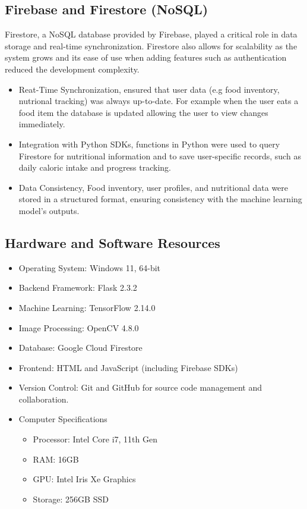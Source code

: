 \documentclass[conference]{IEEEtran}
\begin{document}
\subsection{Firebase and Firestore (NoSQL)}
Firestore, a NoSQL database provided by Firebase, played a critical role in data storage and real-time synchronization. Firestore also allows for scalability as the system grows and its ease of use when adding features such as authentication reduced the development complexity.
\begin{itemize}
    \item Reat-Time Synchronization, ensured that user data (e.g food inventory, nutrional tracking) was always up-to-date. For example when the user eats a food item the database is updated allowing the user to view changes immediately.
    \item Integration with Python SDKs, functions in Python were used to query Firestore for nutritional information and to save user-specific records, such as daily caloric intake and progress tracking.
    \item Data Consistency, Food inventory, user profiles, and nutritional data were stored in a structured format, ensuring consistency with the machine learning model’s outputs.
\end{itemize}

\subsection{Hardware and Software Resources}
\begin{itemize}
    \item Operating System: Windows 11, 64-bit
    \item Backend Framework: Flask 2.3.2
    \item Machine Learning: TensorFlow 2.14.0
    \item Image Processing: OpenCV 4.8.0
    \item Database: Google Cloud Firestore
    \item Frontend: HTML and JavaScript (including Firebase SDKs)
    \item Version Control: Git and GitHub for source code management and collaboration.
    \item Computer Specifications
    \begin{itemize}
        \item Processor: Intel Core i7, 11th Gen
        \item RAM: 16GB
        \item GPU: Intel Iris Xe Graphics
        \item Storage: 256GB SSD
    \end{itemize}
\end{itemize}
\end{document}
